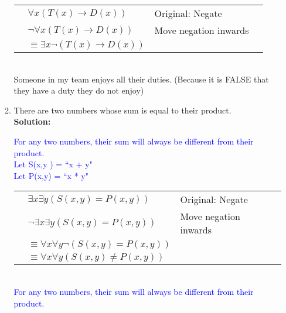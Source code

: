 \documentclass{article}
\renewcommand{\implies}{\rightarrow}
\newcommand{\sol}[1]{\textbf{Solution:\,}\textcolor{blue}{#1}}
\begin{document}
\begin{enumerate}
\begin{enumerate}
{\begin{tabular}{llll}
&\quad $\forall x (T(x)\implies D(x))$&Original: Negate\\
&\quad $\neg\forall x (T(x)\implies D(x))$&Move negation inwards\\
&$\equiv\exists x\neg (T(x)\implies D(x))$&\\
\end{tabular}
\\Someone in my team enjoys all their duties. (Because it is FALSE that they have a duty they do not enjoy)}
\item There are two numbers whose sum is equal to their product.
\\\sol{For any two numbers, their sum will always be different from their product.
\\Let S(x,y   ) = ``x + y"
\\Let P(x,y) = ``x * y"
\\\begin{tabular}{llll}
&\quad $\exists x \exists y(S(x,y)=P(x,y))$&Original: Negate\\
&\quad$\neg\exists x \exists y(S(x,y)=P(x,y))$&Move negation inwards\\
& $\equiv\forall x\forall y\neg(S(x,y)=P(x,y))$&\\
& $\equiv\forall x\forall y(S(x,y)\neq P(x,y))$&\\
\end{tabular}
\\For any two numbers, their sum will always be different from their product.
}
\end{enumerate}


\end{enumerate}
\end{document}

